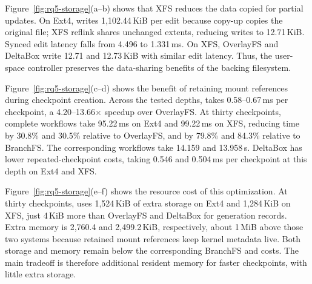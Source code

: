 Figure~\ref{fig:rq5-storage}(a--b) shows that XFS reduces the data
copied for partial updates. On Ext4, \system writes 1,102.44\,KiB per
edit because copy-up copies the original file; XFS reflink shares
unchanged extents, reducing writes to 12.71\,KiB. Synced edit latency
falls from 4.496 to 1.331\,ms. On XFS, OverlayFS and DeltaBox write
12.71 and 12.73\,KiB with similar edit latency. Thus, the user-space
controller preserves the data-sharing benefits of the backing filesystem.

Figure~\ref{fig:rq5-storage}(c--d) shows the benefit of retaining mount
references during checkpoint creation. Across the tested depths,
\system takes 0.58--0.67\,ms per checkpoint, a 4.20--13.66$\times$
speedup over OverlayFS. At thirty checkpoints, complete workflows take
95.22\,ms on Ext4 and 99.22\,ms on XFS, reducing time by 30.8\% and
30.5\% relative to OverlayFS, and by 79.8\% and 84.3\% relative to
BranchFS. The corresponding \trycmd workflows take 14.159 and
13.958\,s. DeltaBox has lower repeated-checkpoint costs, taking
0.546 and 0.504\,ms per checkpoint at this depth on Ext4 and XFS.

Figure~\ref{fig:rq5-storage}(e--f) shows the resource cost of this
optimization. At thirty checkpoints, \system uses 1,524\,KiB of extra
storage on Ext4 and 1,284\,KiB on XFS, just 4\,KiB more than OverlayFS
and DeltaBox for generation records. Extra memory is 2,760.4 and
2,499.2\,KiB, respectively, about 1\,MiB above those two systems
because retained mount references keep kernel metadata live.
Both storage and memory remain below the corresponding BranchFS and
\trycmd costs. The main tradeoff is therefore additional resident
memory for faster checkpoints, with little extra storage.
